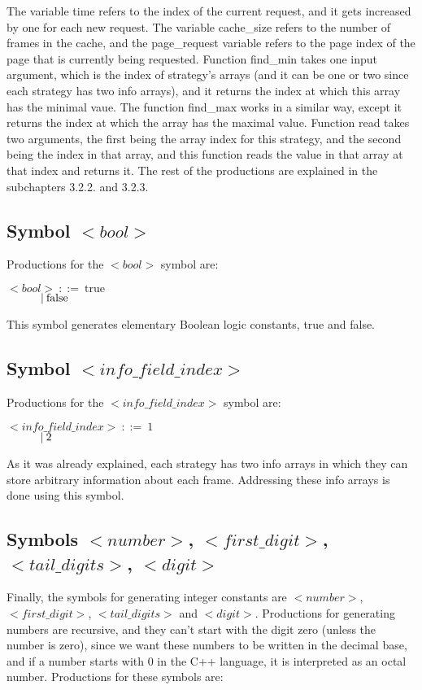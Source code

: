 The variable time refers to the index of the current request, and it gets increased by one for each new request. The variable cache\_size refers to the number of frames in the cache, and the page\_request variable refers to the page index of the page that is currently being requested. Function find\_min takes one input argument, which is the index of strategy's arrays (and it can be one or two since each strategy has two info arrays), and it returns the index at which this array has the minimal vaue. The function find\_max works in a similar way, except it returns the index at which the array has the maximal value. Function read takes two arguments, the first being the array index for this strategy, and the second being the index in that array, and this function reads the value in that array at that index and returns it. The rest of the productions are explained in the subchapters 3.2.2. and 3.2.3.

\subsection{Symbol ${<}bool{>}$}
Productions for the ${<}bool{>}$ symbol are:

\noindent
$ {<}bool{>}\:::=\:\text{true} $\\
$ \indent\indent |\:\text{false} $

This symbol generates elementary Boolean logic constants, true and false.

\subsection{Symbol ${<}info\_field\_index{>}$}
Productions for the ${<}info\_field\_index{>}$ symbol are:

\noindent
$ {<}info\_field\_index{>}\:::=\:\text{1} $\\
$ \indent\indent |\:\text{2} $

As it was already explained, each strategy has two info arrays in which they can store arbitrary information about each frame. Addressing these info arrays is done using this symbol.

\subsection{Symbols ${<}number{>}$, ${<}first\_digit{>}$, ${<}tail\_digits{>}$, ${<}digit{>}$}
Finally, the symbols for generating integer constants are ${<}number{>}$, ${<}first\_digit{>}$, ${<}tail\_digits{>}$ and ${<}digit{>}$. Productions for generating numbers are recursive, and they can't start with the digit zero (unless the number is zero), since we want these numbers to be written in the decimal base, and if a number starts with 0 in the C++ language, it is interpreted as an octal number. Productions for these symbols are:

